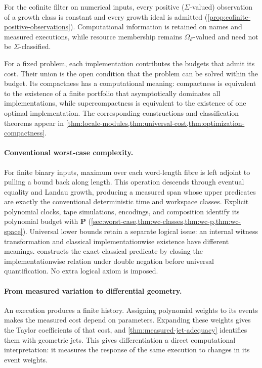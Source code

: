 \documentclass[11pt,a4paper]{article}
\numberwithin{algorithm}{section}
\numberwithin{equation}{section}
\theoremstyle{definition}
\theoremstyle{remark}
\theoremstyle{plain}
\newcommand{\E}{\mathcal E}
\newcommand{\Truth}{\Omega_{\E}}
\theoremstyle{definition}
\theoremstyle{plain}
\begin{document}
For the cofinite filter on numerical inputs, every positive
($\Sigma$-valued) observation of a growth class is constant and every
growth ideal is admitted
(\cref{prop:cofinite-positive-observations}). Computational information
is retained on names and measured executions, while resource membership
remains $\Truth$-valued and need not be $\Sigma$-classified.

For a fixed problem, each implementation contributes the budgets that
admit its cost. Their union is the open condition that the problem can
be solved within the budget. Its compactness has a computational
meaning: compactness is equivalent to the existence of a finite
portfolio that asymptotically dominates all implementations, while
supercompactness is equivalent to the existence of one optimal
implementation. The corresponding constructions and classification
theorems appear in
\cref{thm:locale-modules,thm:universal-cost,thm:optimization-compactness}.


\paragraph{Conventional worst-case complexity.}
For finite binary inputs, maximum over each word-length fibre is left
adjoint to pulling a bound back along length. This operation descends
through eventual equality and Landau growth, producing a measured span
whose upper predicates are exactly the conventional deterministic time
and workspace classes. Explicit polynomial clocks, tape simulations,
encodings, and composition identify its polynomial budget with
$\mathbf P$ (\cref{sec:worst-case,thm:wc-classes,thm:wc-p,thm:wc-space}).
Universal lower bounds retain a separate logical issue: an internal
witness transformation and classical implementationwise existence have
different meanings.  constructs the exact
classical predicate by closing the implementationwise relation under
double negation before universal quantification. No extra logical axiom
is imposed.

\paragraph{From measured variation to differential geometry.}
An execution produces a finite history. Assigning polynomial weights
to its events makes the measured cost depend on parameters. Expanding
these weights gives the Taylor coefficients of that cost, and
\cref{thm:measured-jet-adequacy} identifies them with geometric jets.
This gives differentiation a direct computational interpretation:
it measures the response of the same execution to changes in its
event weights.
\end{document}
